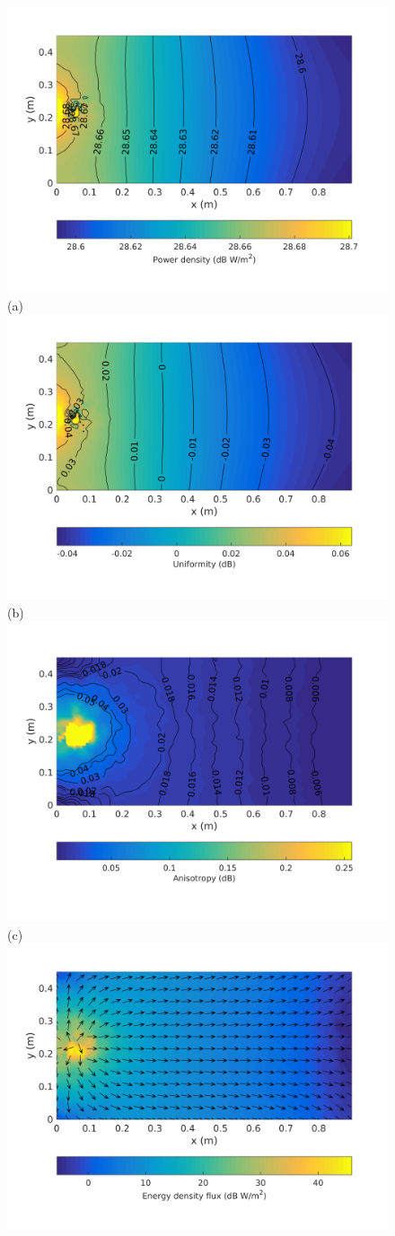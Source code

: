 \documentclass[a4paper]{article}
\numberwithin{equation}{section}
\begin{document}
\begin{figure}[ht]
\begin{center}
\includegraphics[trim={0 11mm 0 12mm},clip,width=0.55\linewidth]{figures/SDM_3D_SU_PowerDensityMap}\\
{\footnotesize (a)}\\
\vspace{2mm}
\includegraphics[trim={0 11mm 0 12mm},clip,width=0.55\linewidth]{figures/SDM_3D_SU_EnergyDensityUniformityMap}\\
{\footnotesize (b)}\\
\vspace{2mm}
\includegraphics[trim={0 11mm 0 12mm},clip,width=0.55\linewidth]{figures/SDM_3D_SU_EnergyDensityAnisotropyMap}\\
{\footnotesize (c)}\\
\vspace{2mm}
\includegraphics[trim={0 11mm 0 12mm},clip,width=0.55\linewidth]{figures/SDM_3D_SU_EnergyDensityFluxMap}\\

\end{center}
\end{figure}
\end{document}
